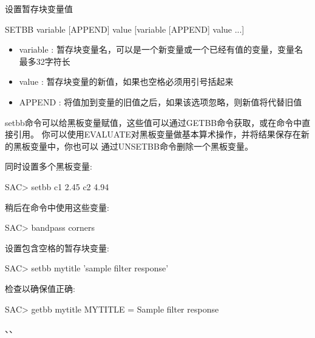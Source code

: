 \label{cmd:setbb}

设置暂存块变量值

\begin{SACSTX}
SETBB variable  [APPEND] value [variable [APPEND] value ...]
\end{SACSTX}

\begin{itemize}
\item variable : 暂存块变量名，可以是一个新变量或一个已经有值的变量，变量名最多32字符长
\item value : 暂存块变量的新值，如果也空格必须用引号括起来 
\item APPEND : 将值加到变量的旧值之后，如果该选项忽略，则新值将代替旧值 
\end{itemize}

setbb命令可以给黑板变量赋值，这些值可以通过GETBB命令获取，或在命令中直接引用。
你可以使用EVALUATE对黑板变量做基本算术操作，并将结果保存在新的黑板变量中，你也可以
通过UNSETBB命令删除一个黑板变量。

同时设置多个黑板变量:
\begin{SACCode}
SAC> setbb c1 2.45 c2 4.94
\end{SACCode}

稍后在命令中使用这些变量:
\begin{SACCode}
SAC> bandpass corners %
\end{SACCode}

设置包含空格的暂存块变量:
\begin{SACCode}
SAC> setbb mytitle 'sample filter response'
\end{SACCode}

检查以确保值正确:
\begin{SACCode}
SAC> getbb mytitle
 MYTITLE = Sample filter response
\end{SACCode}

、、
